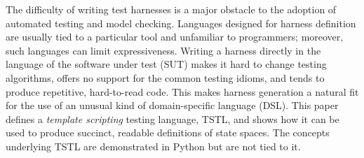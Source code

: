 The difficulty of writing test harnesses is a major obstacle to the
adoption of automated testing and model checking.  Languages designed
for harness definition are usually tied to a particular tool and
unfamiliar to programmers; moreover, such languages can limit
expressiveness.  Writing a harness directly in the language of the
software under test (SUT) makes it hard to change testing algorithms,
offers no support for the common testing idioms, and tends to
produce repetitive, hard-to-read code.  This makes harness
generation a natural fit for the use of an unusual kind of domain-specific language (DSL). This paper defines a \emph{template
scripting} testing language, TSTL, and shows how it can be used to
produce succinct, readable definitions of state spaces.  The concepts
underlying TSTL are demonstrated in Python but are not tied to it.


